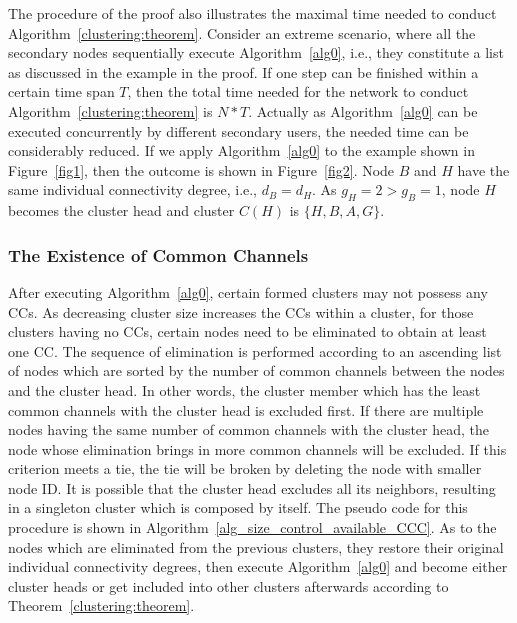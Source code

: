 \documentclass[10pt,journal,compsoc]{IEEEtran}
\theoremstyle{mytheoremstyle}
\theoremstyle{mytheoremstyle}
\theoremstyle{mytheoremstyle}
\newcommand{\ie}{i.e., }
\begin{document}
The procedure of the proof also illustrates the maximal time needed to conduct Algorithm~\ref{clustering:theorem}. 
Consider an extreme scenario, where all the secondary nodes sequentially execute Algorithm~\ref{alg0}, \ie they constitute a list as discussed in the example in the proof.
%
If one step can be finished within a certain time span $T$, then the total time needed for the network to conduct Algorithm~\ref{clustering:theorem} is $N*T$.
Actually as Algorithm~\ref{alg0} can be executed concurrently by different secondary users, the needed time can be considerably reduced.
%
If we apply Algorithm~\ref{alg0} to the example shown in Figure~\ref{fig1}, then the outcome is shown in Figure~\ref{fig2}.
Node $B$ and $H$ have the same individual connectivity degree, i.e., $d_B=d_H$. As $g_H=2>g_B=1$, node $H$ becomes the cluster head and cluster $C(H)$ is $\{H, B, A, G\}$.
	




\subsubsection{The Existence of Common Channels}
\label{ross_p1_guarantee_ccc}
After executing Algorithm~\ref{alg0}, certain formed clusters may not possess any CCs.
As decreasing cluster size increases the CCs within a cluster, for those clusters having no CCs, certain nodes need to be eliminated to obtain at least one CC.
The sequence of elimination is performed according to an ascending list of nodes which are sorted by the number of common channels between the nodes and the cluster head. 
In other words, the cluster member which has the least common channels with the cluster head is excluded first.
If there are multiple nodes having the same number of common channels with the cluster head, the node whose elimination brings in more common channels will be excluded.
If this criterion meets a tie, the tie will be broken by deleting the node with smaller node ID.
It is possible that the cluster head excludes all its neighbors, resulting in a singleton cluster which is composed by itself.
The pseudo code for this procedure is shown in Algorithm~\ref{alg_size_control_available_CCC}.
As to the nodes which are eliminated from the previous clusters, they restore their original individual connectivity degrees, then execute Algorithm~\ref{alg0} and become either cluster heads or get included into other clusters afterwards according to Theorem~\ref{clustering:theorem}.
\end{document}
